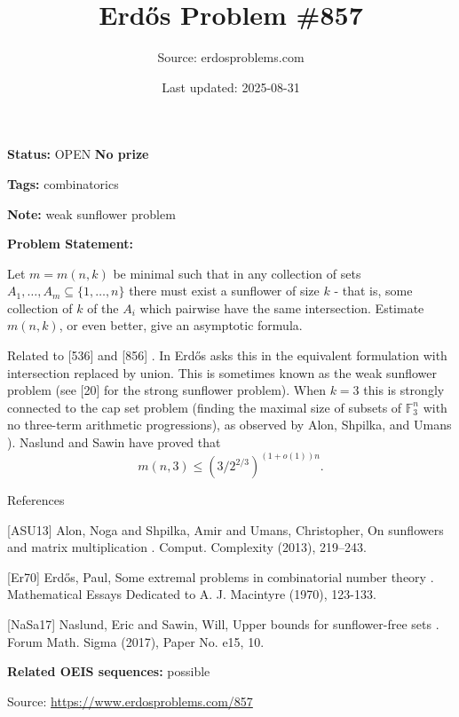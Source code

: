 \documentclass{article}
\title{Erd\H{o}s Problem \#857}
\date{Last updated: 2025-08-31}
\author{Source: erdosproblems.com}
\begin{document}
\maketitle

\noindent\textbf{Status:} OPEN \quad \textbf{No prize}

\noindent\textbf{Tags:} combinatorics

\medskip
\noindent\textbf{Note:} weak sunflower problem

\medskip

\noindent\textbf{Problem Statement:}

Let $m=m(n,k)$ be minimal such that in any collection of sets $A_1,\ldots,A_m\subseteq \{1,\ldots,n\}$ there must exist a sunflower of size $k$ - that is, some collection of $k$ of the $A_i$ which pairwise have the same intersection. Estimate $m(n,k)$, or even better, give an asymptotic formula.




Related to [536] and [856] . In \cite{Er70} Erd\H{o}s asks this in the equivalent formulation with intersection replaced by union. This is sometimes known as the weak sunflower problem (see [20] for the strong sunflower problem). When $k=3$ this is strongly connected to the cap set problem (finding the maximal size of subsets of $\mathbb{F}_3^n$ with no three-term arithmetic progressions), as observed by Alon, Shpilka, and Umans \cite{ASU13}). Naslund and Sawin \cite{NaSa17} have proved that\[m(n,3) \leq (3/2^{2/3})^{(1+o(1))n}.\]




References

[ASU13] Alon, Noga and Shpilka, Amir and Umans, Christopher, On sunflowers and matrix multiplication . Comput. Complexity (2013), 219--243.

[Er70] Erd\H{o}s, Paul, Some extremal problems in combinatorial number theory . Mathematical Essays Dedicated to A. J. Macintyre (1970), 123-133.

[NaSa17] Naslund, Eric and Sawin, Will, Upper bounds for sunflower-free sets . Forum Math. Sigma (2017), Paper No. e15, 10.

\noindent\textbf{Related OEIS sequences:} possible


\bigskip
\noindent\small{Source: \url{https://www.erdosproblems.com/857}}
\end{document}
